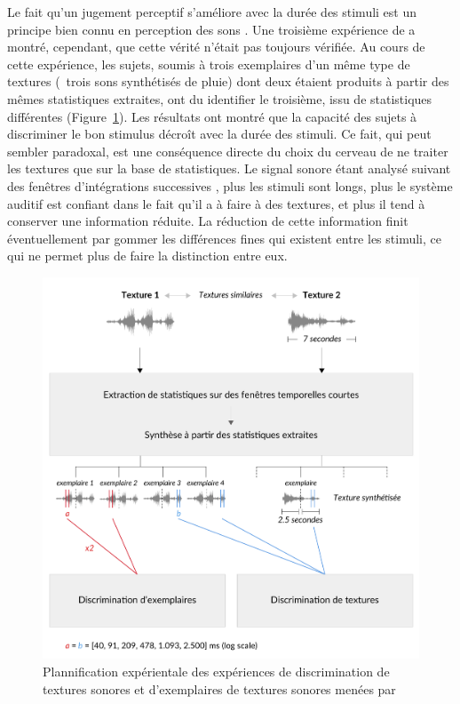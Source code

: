 Le fait qu'un jugement perceptif s'améliore avec la durée des stimuli est un principe bien connu en perception des sons \citep{moore1973frequency}. Une troisième expérience de \citep{mcdermott2013summary} a montré, cependant, que cette vérité n'était pas toujours vérifiée. Au cours de cette expérience, les sujets, soumis à trois exemplaires d'un même type de textures (\eg~trois sons synthétisés de pluie) dont deux étaient produits à partir des mêmes statistiques extraites, ont du identifier le troisième, issu de statistiques différentes (Figure~\ref{fig:textureMcder}). Les résultats ont montré que la capacité des sujets à discriminer le bon stimulus décroît avec la durée des stimuli. Ce fait, qui peut sembler paradoxal, est une conséquence directe du choix du cerveau de ne traiter les textures que sur la base de statistiques. Le signal sonore étant analysé suivant des fenêtres d'intégrations successives \citep{yabe1998temporal,poeppel2003analysis}, plus les stimuli sont longs, plus le système auditif est confiant dans le fait qu'il a à faire à des textures, et plus il tend à conserver une information réduite. La réduction de cette information finit éventuellement par gommer les différences fines qui existent entre les stimuli, ce qui ne permet plus de faire la distinction entre eux.


\begin{figure}[t]
        \myfloatalign
        \includegraphics[width=.8\linewidth]{gfx/ch_3/mcder}
        \caption[Plannification expérimentale de l'expérience de discrimination de textures sonores et d'exemplaires de textures sonores]{Plannification expérientale des expériences de discrimination de textures sonores et d'exemplaires de textures sonores menées par \citep{mcdermott2013summary}}\label{fig:textureMcder}
\end{figure}

